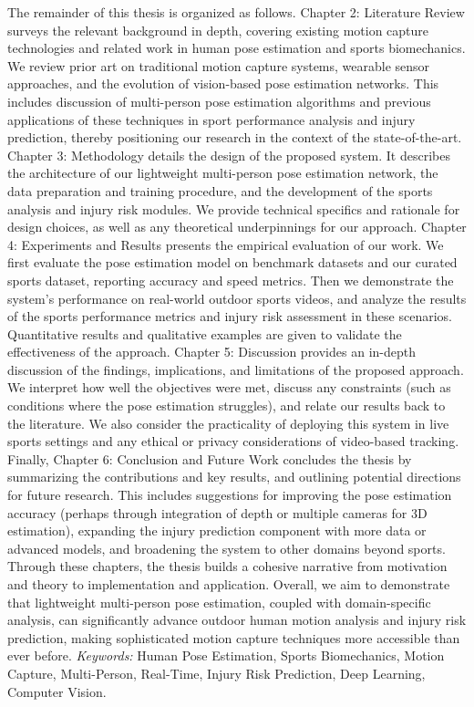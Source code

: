 The remainder of this thesis is organized as follows. Chapter 2: Literature Review surveys the relevant background in depth, covering existing motion capture technologies and related work in human pose estimation and sports biomechanics. We review prior art on traditional motion capture systems, wearable sensor approaches, and the evolution of vision-based pose estimation networks. This includes discussion of multi-person pose estimation algorithms and previous applications of these techniques in sport performance analysis and injury prediction, thereby positioning our research in the context of the state-of-the-art. Chapter 3: Methodology details the design of the proposed system. It describes the architecture of our lightweight multi-person pose estimation network, the data preparation and training procedure, and the development of the sports analysis and injury risk modules. We provide technical specifics and rationale for design choices, as well as any theoretical underpinnings for our approach. Chapter 4: Experiments and Results presents the empirical evaluation of our work. We first evaluate the pose estimation model on benchmark datasets and our curated sports dataset, reporting accuracy and speed metrics. Then we demonstrate the system’s performance on real-world outdoor sports videos, and analyze the results of the sports performance metrics and injury risk assessment in these scenarios. Quantitative results and qualitative examples are given to validate the effectiveness of the approach. Chapter 5: Discussion provides an in-depth discussion of the findings, implications, and limitations of the proposed approach. We interpret how well the objectives were met, discuss any constraints (such as conditions where the pose estimation struggles), and relate our results back to the literature. We also consider the practicality of deploying this system in live sports settings and any ethical or privacy considerations of video-based tracking. Finally, Chapter 6: Conclusion and Future Work concludes the thesis by summarizing the contributions and key results, and outlining potential directions for future research. This includes suggestions for improving the pose estimation accuracy (perhaps through integration of depth or multiple cameras for 3D estimation), expanding the injury prediction component with more data or advanced models, and broadening the system to other domains beyond sports. Through these chapters, the thesis builds a cohesive narrative from motivation and theory to implementation and application. Overall, we aim to demonstrate that lightweight multi-person pose estimation, coupled with domain-specific analysis, can significantly advance outdoor human motion analysis and injury risk prediction, making sophisticated motion capture techniques more accessible than ever before. \medskip\noindent\textit{Keywords:} Human Pose Estimation, Sports Biomechanics, Motion Capture, Multi-Person, Real-Time, Injury Risk Prediction, Deep Learning, Computer Vision.